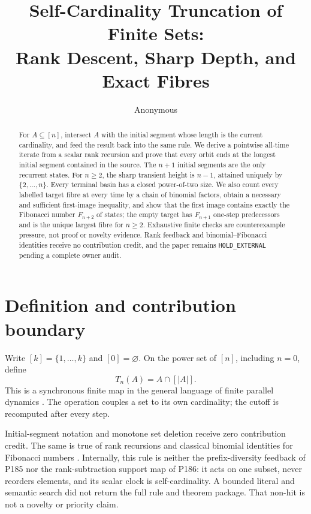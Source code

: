 \documentclass[a4paper,11pt]{amsart}
\title[Self-cardinality truncation]{Self-Cardinality Truncation of Finite Sets:\\
Rank Descent, Sharp Depth, and Exact Fibres}
\author{Anonymous}
\date{}
\theoremstyle{remark}
\begin{document}
\begin{abstract}
For $A\subseteq[n]$, intersect $A$ with the initial segment whose length is
the current cardinality, and feed the result back into the same rule.  We
derive a pointwise all-time iterate from a scalar rank recursion and prove
that every orbit ends at the longest initial segment contained in the source.
The $n+1$ initial segments are the only recurrent states.  For $n\geq2$, the
sharp transient height is $n-1$, attained uniquely by
$\{2,\ldots,n\}$.  Every terminal basin has a closed power-of-two size.  We
also count every labelled target fibre at every time by a chain of binomial
factors, obtain a necessary and sufficient first-image inequality, and show
that the first image contains exactly the Fibonacci number $F_{n+2}$ of
states; the empty target has $F_{n+1}$ one-step predecessors and is the unique
largest fibre for $n\geq2$.  Exhaustive finite checks are
counterexample pressure, not proof or novelty evidence.  Rank feedback and
binomial--Fibonacci identities receive no contribution credit, and the paper
remains \texttt{HOLD\_EXTERNAL} pending a complete owner audit.
\end{abstract}

\maketitle

\section{Definition and contribution boundary}

Write $[k]=\{1,\ldots,k\}$ and $[0]=\varnothing$.  On the power set of
$[n]$, including $n=0$, define
\begin{equation}\label{eq:T}
 T_n(A)=A\cap[|A|].
\end{equation}
This is a synchronous finite map in the general language of finite parallel
dynamics \cite{AledoMartinezValverde2015}.  The operation couples a set to
its own cardinality; the cutoff is recomputed after every step.

Initial-segment notation and monotone set deletion receive zero contribution
credit.  The same is true of rank recursions and classical binomial identities
for Fibonacci numbers \cite{GrahamKnuthPatashnik1994}.  Internally, this rule is neither the
prefix-diversity feedback of P185 nor the rank-subtraction support map of
P186: it acts on one subset, never reorders elements, and its scalar clock is
self-cardinality.  A bounded literal and semantic search did not return the
full rule and theorem package.  That non-hit is not a novelty or priority
claim.
\end{document}
